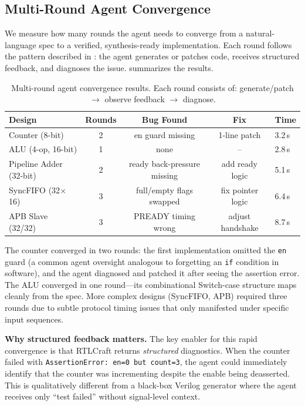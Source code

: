\documentclass[11pt]{article}
\begin{document}
\subsection{Multi-Round Agent Convergence}
\label{sec:exp_convergence}

We measure how many rounds the agent needs to converge from a natural-language spec to a verified, synthesis-ready implementation. Each round follows the pattern described in : the agent generates or patches code, receives structured feedback, and diagnoses the issue.  summarizes the results.

\begin{table}[htbp]
\centering
\caption{Multi-round agent convergence results. Each round consists of: generate/patch $\rightarrow$ observe feedback $\rightarrow$ diagnose.}
\label{tab:convergence}
\begin{tabular}{@{}lcccl@{}}
    \toprule
    \textbf{Design} & \textbf{Rounds} & \textbf{Bug Found} & \textbf{Fix} & \textbf{Time} \\
    \midrule
    Counter (8-bit)  & 2 & en guard missing & 1-line patch & 3.2\,s \\
    ALU (4-op, 16-bit) & 1 & none & -- & 2.8\,s \\
    Pipeline Adder (32-bit) & 2 & ready back-pressure missing & add ready logic & 5.1\,s \\
    SyncFIFO (32$\times$16) & 3 & full/empty flags swapped & fix pointer logic & 6.4\,s \\
    APB Slave (32/32) & 3 & PREADY timing wrong & adjust handshake & 8.7\,s \\
    \bottomrule
\end{tabular}
\end{table}

The counter converged in two rounds: the first implementation omitted the \texttt{en} guard (a common agent oversight analogous to forgetting an \texttt{if} condition in software), and the agent diagnosed and patched it after seeing the assertion error. The ALU converged in one round---its combinational Switch-case structure maps cleanly from the spec. More complex designs (SyncFIFO, APB) required three rounds due to subtle protocol timing issues that only manifested under specific input sequences.

\textbf{Why structured feedback matters.} The key enabler for this rapid convergence is that RTLCraft returns \textit{structured} diagnostics. When the counter failed with \texttt{AssertionError: en=0 but count=3}, the agent could immediately identify that the counter was incrementing despite the enable being deasserted. This is qualitatively different from a black-box Verilog generator where the agent receives only ``test failed'' without signal-level context.
\end{document}
